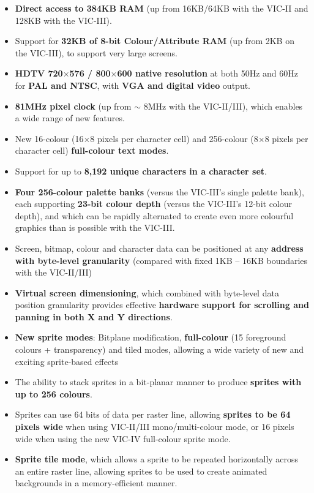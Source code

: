 \begin{itemize}
\item {\bf Direct access to 384KB RAM} (up from 16KB/64KB with the VIC-II and 128KB
  with the VIC-III).
\item Support for {\bf 32KB of 8-bit Colour/Attribute RAM} (up from 2KB on the VIC-III), to
  support very large screens.
\item {\bf HDTV 720$\times$576 / 800$\times$600 native resolution} at both 50Hz and 60Hz for {\bf PAL and NTSC}, with {\bf VGA and digital video} output.
\item {\bf 81MHz pixel clock} (up from $\sim$ 8MHz with the VIC-II/III), which enables a wide range of new features.
\item New 16-colour (16$\times$8 pixels per character cell) and 256-colour (8$\times$8 pixels per character cell) {\bf full-colour text modes}.
\item Support for up to {\bf 8,192 unique characters in a character set}.
\item {\bf Four 256-colour palette banks} (versus the VIC-III's single palette bank), each supporting {\bf 23-bit colour depth} (versus the VIC-III's 12-bit colour depth), and which can be rapidly alternated to create even more colourful graphics than is possible with the VIC-III.
\item Screen, bitmap, colour and character data can be positioned at any {\bf address with byte-level granularity} (compared with fixed 1KB -- 16KB boundaries with the VIC-II/III)
\item {\bf Virtual screen dimensioning}, which combined with byte-level data position granularity provides effective {\bf hardware support for scrolling and panning in both X and Y directions}.
\item {\bf New sprite modes}: Bitplane modification, {\bf full-colour} (15 foreground colours + transparency) and tiled modes, allowing a wide variety of new and exciting sprite-based effects
  \item The ability to stack sprites in a bit-planar manner to produce {\bf sprites with up to 256 colours}.
\item Sprites can use 64 bits of data per raster line, allowing {\bf sprites to be 64 pixels wide} when using VIC-II/III mono/multi-colour mode, or 16 pixels wide when using the new VIC-IV full-colour sprite mode.
\item {\bf Sprite tile mode}, which allows a sprite to be repeated horizontally across an entire raster line, allowing sprites to be used to create  animated backgrounds in a memory-efficient manner.

\end{itemize}
